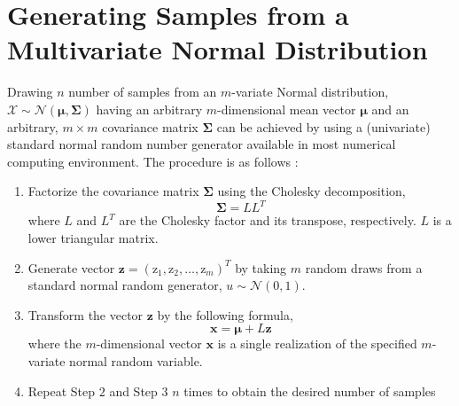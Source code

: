 \section{Generating Samples from a Multivariate Normal Distribution}\label{app:mvn_sampling}

Drawing $n$ number of samples from an $m$-variate Normal distribution, $\bm{\mathcal{X}} \sim \mathcal{N}(\boldsymbol{\mu}, \boldsymbol{\Sigma})$ having an arbitrary $m$-dimensional mean vector $\boldsymbol{\mu}$ and an arbitrary, $m \times m$ covariance matrix $\boldsymbol{\Sigma}$ can be achieved by using a (univariate) standard normal random number generator available in most numerical computing environment.
The procedure is as follows \cite{Lange2010}:

\begin{enumerate}
	\item Factorize the covariance matrix $\boldsymbol{\Sigma}$ using the Cholesky decomposition,
	\begin{equation}
	\boldsymbol{\Sigma} = L L^T
	\end{equation}
	where $L$ and $L^T$ are the Cholesky factor and its transpose, respectively. $L$ is a lower triangular matrix.
	
	\item Generate vector $\mathbf{z}=(\text{z}_1, \text{z}_2, \dots, \text{z}_m)^T$ by taking $m$ random draws from a standard normal random generator, $u \sim \mathcal{N}(0, 1)$.
	
	\item Transform the vector $\mathbf{z}$ by the following formula,
	\begin{equation}
		\mathbf{x} = \boldsymbol{\mu} + L \mathbf{z}
	\end{equation}
	where the $m$-dimensional vector $\mathbf{x}$ is a single realization of the specified $m$-variate normal random variable.
	
	\item Repeat Step $2$ and Step $3$ $n$ times to obtain the desired number of samples 
\end{enumerate}
